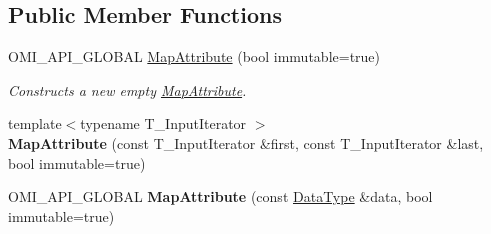 \subsection*{Public Member Functions}
\begin{DoxyCompactItemize}
\item 
O\+M\+I\+\_\+\+A\+P\+I\+\_\+\+G\+L\+O\+B\+AL \hyperlink{classomi_1_1_map_attribute_a5c2fc5c4bf83db0d7d9f7b06c1d022d9}{Map\+Attribute} (bool immutable=true)
\begin{DoxyCompactList}\small\item\em Constructs a new empty \hyperlink{classomi_1_1_map_attribute}{Map\+Attribute}. \end{DoxyCompactList}\item 
{\footnotesize template$<$typename T\+\_\+\+Input\+Iterator $>$ }\\{\bfseries Map\+Attribute} (const T\+\_\+\+Input\+Iterator \&first, const T\+\_\+\+Input\+Iterator \&last, bool immutable=true)\hypertarget{classomi_1_1_map_attribute_a7b4361cdb47fda693aac20424b9f0450}{}\label{classomi_1_1_map_attribute_a7b4361cdb47fda693aac20424b9f0450}

\item 
O\+M\+I\+\_\+\+A\+P\+I\+\_\+\+G\+L\+O\+B\+AL {\bfseries Map\+Attribute} (const \hyperlink{classomi_1_1_map_attribute_ac5a11b90e684944a18bcd18376d7eed1}{Data\+Type} \&data, bool immutable=true)\hypertarget{classomi_1_1_map_attribute_a4a8ff9223a0cc5584995fc7b5048d839}{}\label{classomi_1_1_map_attribute_a4a8ff9223a0cc5584995fc7b5048d839}


\end{DoxyCompactItemize}
